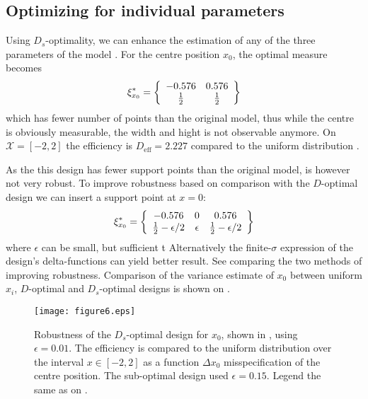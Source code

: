 \documentclass[12pt]{iopart}
\begin{document}
\subsection{Optimizing for individual parameters}
\label{seq:exopts}

Using $D_s$-optimality, we can enhance the estimation of any of the three parameters of the model . For the centre position $x_0$, the optimal measure becomes
\begin{equation}
\xi^*_{x_0} = \left\{
  \begin{array}{c c}
    -0.576 & 0.576 \\
    \frac{1}{2} & \frac{1}{2}\\
  \end{array} \right \}
\end{equation}
which has fewer number of points than the original model, thus while the centre is obviously measurable, the width and hight is not observable anymore.  On $\mathcal{X} = [-2,2]$ the efficiency is $D_\mathrm{eff} = 2.227$ compared to the uniform distribution .

As the this design has fewer support points than the original model, is however not very robust. To improve robustness based on comparison with the $D$-optimal design we can insert a support point at $x=0$:
\begin{equation}
\xi^*_{x_0} = \left\{
  \begin{array}{c c c}
    -0.576 & 0 & 0.576 \\
    \frac{1}{2}-\epsilon/2 & \epsilon & \frac{1}{2}-\epsilon/2\\
  \end{array} \right \}
\label{eq:dsx0robust}
\end{equation}
where $\epsilon$ can be small, but sufficient t Alternatively the finite-$\sigma$ expression of the design's delta-functions can yield better result. See  comparing the two methods of improving robustness. Comparison of the variance estimate of $x_0$ between uniform $x_i$, $D$-optimal and $D_s$-optimal designs is shown on .

\begin{figure}
\texttt{[image: figure6.eps]}
\caption{Robustness of the $D_s$-optimal design for $x_0$, shown in , using $\epsilon = 0.01$. The efficiency is compared to the uniform distribution over the interval $x\in [-2,2]$ as a function $\Delta x_0$ misspecification of the centre position. The sub-optimal design used $\epsilon = 0.15$. Legend the same as on .}
\label{fig:dsx0robust}
\end{figure}
\end{document}
